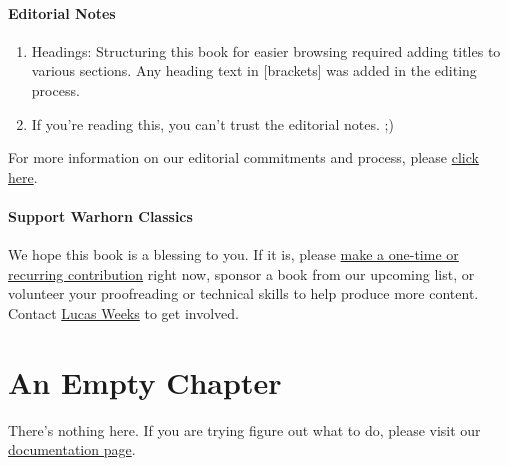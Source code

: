 \documentclass[
]{book}
\providecommand{\tightlist}{%
  \setlength{\itemsep}{0pt}\setlength{\parskip}{0pt}}
\begin{document}
\hypertarget{editorial-notes}{%
\subsubsection*{Editorial Notes}\label{editorial-notes}}

\begin{enumerate}
\def\labelenumi{\arabic{enumi}.}
\tightlist
\item
  Headings: Structuring this book for easier browsing required adding titles to various sections. Any heading text in {[}brackets{]} was added in the editing process.
\item
  If you're reading this, you can't trust the editorial notes. ;)
\end{enumerate}

For more information on our editorial commitments and process, please \href{https://classics.warhornmedia.com/editorial}{click here}.

\hypertarget{support-warhorn-classics}{%
\subsubsection*{Support Warhorn Classics}\label{support-warhorn-classics}}

We hope this book is a blessing to you. If it is, please \href{https://warhornmedia.com/give}{make a one-time or recurring contribution} right now, sponsor a book from our upcoming list, or volunteer your proofreading or technical skills to help produce more content. Contact \href{mailto:lucas@beggarsborn.com}{Lucas Weeks} to get involved.

\clearpage
\setcounter{page}{1}

\hypertarget{an-empty-chapter}{%
\chapter{An Empty Chapter}\label{an-empty-chapter}}

There's nothing here. If you are trying figure out what to do, please visit our \href{https://warhornmedia.github.io/classics-documentation}{documentation page}.
\end{document}
